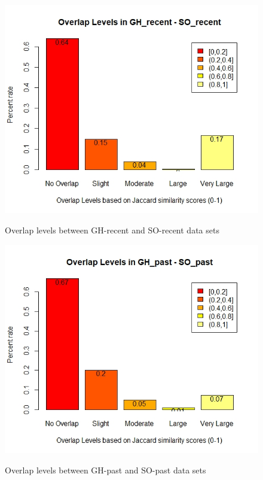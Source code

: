         
        \begin{figure}
          \centering
          \includegraphics[width=\textwidth]{figures/overlap_GH_SO_recent.jpeg}\\
          \caption{Overlap levels between GH-recent and SO-recent data sets}
          \label{fig:overlap_GH_SO_recent}
        \end{figure}
        
        \begin{figure}
          \centering
          \includegraphics[width=\textwidth]{figures/overlap_SO_GH_past.jpeg}\\
          \caption{Overlap levels between GH-past and SO-past data sets}
          \label{fig:overlap_GH_SO_past}
        \end{figure}
        
